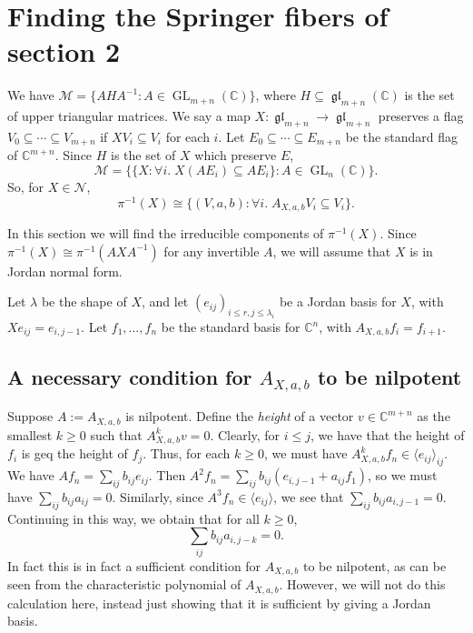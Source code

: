 \documentclass[12pt,psamsfonts]{article}
\DeclareMathOperator{\GL}{GL}
\DeclareMathOperator{\gl}{\mathfrak{gl}}
\begin{document}
\section{Finding the Springer fibers of section 2}
We have \(\mathcal{M} = \{AHA^{-1} : A \in \GL_{m + n}(\mathbb{C})\}\), where \(H \subseteq \gl_{m + n}(\mathbb{C})\) is the set of upper triangular matrices.
We say a map \(X : \gl_{m + n} \to \gl_{m + n}\) preserves a flag \(V_0 \subseteq \cdots \subseteq V_{m + n}\) if \(XV_i \subseteq V_i\) for each \(i\).
Let \(E_0 \subseteq \cdots \subseteq E_{m + n}\) be the standard flag of \(\mathbb{C}^{m + n}\).
Since \(H\) is the set of \(X\) which preserve \(E\),
\[\mathcal{M} = \{\{X : \forall i. \; X(AE_i) \subseteq AE_i\} : A \in \GL_n(\mathbb{C})\}.\]
So, for \(X \in \mathcal{N}\),
\[\pi^{-1}(X) \cong \{(V, a, b) : \forall i. \; A_{X, a, b} V_i \subseteq V_i\}.\]
\par In this section we will find the irreducible components of \(\pi^{-1}(X)\).
Since \(\pi^{-1}(X) \cong \pi^{-1}(AXA^{-1})\) for any invertible \(A\), we will assume that \(X\) is in Jordan normal form.
\par Let \(\lambda\) be the shape of \(X\), and let \((e_{ij})_{i \leq r, j \leq \lambda_i}\) be a Jordan basis for \(X\), with \(X e_{ij} = e_{i,j - 1}\).
Let \(f_1, ..., f_n\) be the standard basis for \(\mathbb{C}^n\), with \(A_{X, a, b} f_i = f_{i + 1}\).

\subsection{A necessary condition for \(A_{X, a, b}\) to be nilpotent}
Suppose \(A := A_{X, a, b}\) is nilpotent.
Define the \emph{height} of a vector \(v \in \mathbb{C}^{m + n}\) as the smallest \(k \geq 0\) such that \(A_{X, a, b}^k v = 0\).
Clearly, for \(i \leq j\), we have that the height of \(f_i\) is geq the height of \(f_j\).
Thus, for each \(k \geq 0\), we must have \(A_{X, a, b}^k f_n \in \langle e_{ij} \rangle_{ij}\).
We have \(Af_n = \sum_{ij} b_{ij} e_{ij}\).
Then \(A^2 f_n = \sum_{ij} b_{ij} (e_{i, j - 1} + a_{ij} f_1)\), so we must have \(\sum_{ij} b_{ij} a_{ij} = 0\).
Similarly, since \(A^3 f_n \in \langle e_{ij}\rangle\), we see that \(\sum_{ij} b_{ij} a_{i, j - 1} = 0\).
Continuing in this way, we obtain that for all \(k \geq 0\),
\begin{equation}\label{ab_nilp}\sum_{ij} b_{ij} a_{i,j - k} = 0.\end{equation}
In fact this is in fact a sufficient condition for \(A_{X, a, b}\) to be nilpotent, as can be seen from the characteristic polynomial of \(A_{X, a, b}\).
However, we will not do this calculation here, instead just showing that it is sufficient by giving a Jordan basis.
\end{document}

